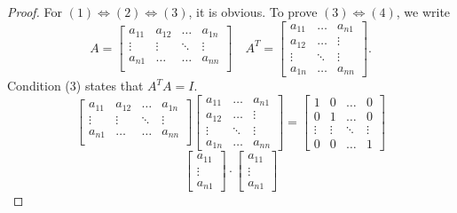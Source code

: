 \documentclass[11pt]{article}
\begin{document}
    \begin{proof}
        For \((1) \Leftrightarrow (2) \Leftrightarrow (3)\), it is obvious. To prove \((3) \Leftrightarrow (4)\), we write \[A = \begin{bmatrix}
            a_{11} & a_{12} & \dots & a_{1n} \\
            \vdots & \vdots & \ddots & \vdots \\
            a_{n1} & \dots & \dots & a_{nn} \\
        \end{bmatrix} \quad A^T = \begin{bmatrix}
            a_{11} & \dots & a_{n1} \\
            a_{12} & \dots & \vdots \\
            \vdots & \ddots & \vdots \\
            a_{1n} & \dots & a_{nn}
        \end{bmatrix}.\] Condition (3) states that \(A^T A = I\). 
        \[\begin{bmatrix}
            a_{11} & a_{12} & \dots & a_{1n} \\
            \vdots & \vdots & \ddots & \vdots \\
            a_{n1} & \dots & \dots & a_{nn} \\
        \end{bmatrix} \begin{bmatrix}
            a_{11} & \dots & a_{n1} \\
            a_{12} & \dots & \vdots \\
            \vdots & \ddots & \vdots \\
            a_{1n} & \dots & a_{nn}
        \end{bmatrix} = \begin{bmatrix}
            1 & 0 & \dots & 0 \\
            0 & 1 & \dots & 0 \\
            \vdots & \vdots & \ddots & \vdots \\
            0 & 0 & \dots & 1
        \end{bmatrix}\] \[\begin{bmatrix}
            a_{11} \\ \vdots \\ a_{n1}
        \end{bmatrix} \cdot \begin{bmatrix}
            a_{11} \\ \vdots \\ a_{n1}

\end{bmatrix}\]
\end{proof}
\end{document}
